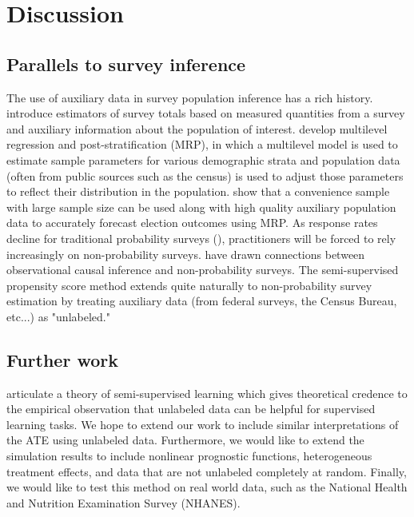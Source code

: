 \documentclass[aos]{imsart}
\begin{document}
\section{Discussion}


\subsection{Parallels to survey inference}

The use of auxiliary data in survey population inference has a rich history. \cite{horvitz1952generalization} 
introduce estimators of survey totals based on measured quantities from a survey and auxiliary information about the population of interest.
\cite{GelmanLittle97} develop multilevel regression and post-stratification (MRP), 
in which a multilevel model is used to estimate sample parameters for various demographic strata and population data 
(often from public sources such as the census) is used to adjust those parameters to reflect their distribution in the population. 
\cite{WANG2015980} show that a convenience sample with large sample size can be used along with 
high quality auxiliary population data to accurately forecast election outcomes using MRP. 
As response rates decline for traditional probability surveys (\cite{kennedy2019response}), 
practitioners will be forced to rely increasingly on non-probability surveys.
\cite{mkks2017} have drawn connections between observational causal inference and non-probability surveys. 
The semi-supervised propensity score method extends quite naturally to non-probability survey estimation 
by treating auxiliary data (from federal surveys, the Census Bureau, etc...) as "unlabeled."

\subsection{Further work}

\cite{belkin2006manifold} articulate a theory of semi-supervised learning which gives theoretical credence to the empirical observation 
that unlabeled data can be helpful for supervised learning tasks. We hope to extend our work to include similar interpretations of the ATE using unlabeled data. Furthermore, we would like to extend the simulation results to include nonlinear prognostic functions, heterogeneous treatment 
effects, and data that are not unlabeled completely at random.
Finally, we would like to test this method on real world data, such as the National Health and Nutrition Examination Survey (NHANES). 

 


\end{document}
